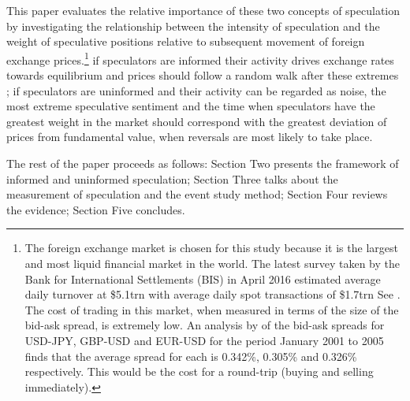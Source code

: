 \documentclass[ijfs,article,submit,oneauthor,pdftex,10pt,a4paper]{mdpi}
\begin{document}
This paper evaluates the relative importance of these two concepts of speculation by investigating the relationship between the intensity of speculation and the weight of speculative positions relative to subsequent movement of foreign exchange prices.\footnote{\label{FX}The foreign exchange market is chosen for this study because it is the largest and most liquid financial market in the world.  The latest survey taken by the Bank for International Settlements (BIS) in April 2016 estimated average daily turnover at \$5.1trn with average daily spot transactions of \$1.7trn See \citet{BISFX2016}.  The cost of trading in this market, when measured in terms of the size of the bid-ask spread, is extremely low. An analysis by \citet{Steely2013} of the bid-ask spreads for USD-JPY, GBP-USD and EUR-USD for the period January 2001 to 2005 finds that the average spread for each is 0.342\%, 0.305\% and 0.326\% respectively.  This would be the cost for a round-trip (buying and selling immediately).}  if speculators are informed their activity drives exchange rates towards equilibrium and prices should follow a random walk after these extremes ; if speculators are uninformed and their activity can be regarded as noise, the most extreme speculative sentiment and the time when speculators have the greatest weight in the market should correspond with the greatest deviation of prices from fundamental value, when reversals are most likely to take place.  

The rest of the paper proceeds as follows:  Section Two presents the framework of informed and uninformed speculation; Section Three talks about the measurement of speculation and the event study method; Section Four reviews the evidence; Section Five concludes. 
\end{document}
